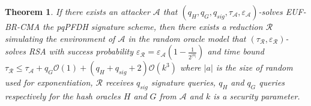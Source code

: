 \documentclass[a4paper,11pt]{article}
\newtheorem{theorem}{Theorem}[section]
\begin{document}
\begin{theorem}
If there exists an attacker $\mathcal{A}$ that    $(q_{H}, q_{G} , q_{sig} , \tau_{\mathcal{A}} ,\varepsilon_{\mathcal{A}} )$-solves
EUF-BR-CMA the pqPFDH signature scheme, then there exists a reduction $\mathcal{R}$ simulating the environment of $\mathcal{A}$ in the random oracle model that  $(\tau_{\mathcal{R}} ,\varepsilon_{\mathcal{R}} )$-solves RSA with  success  probability $\varepsilon_{\mathcal{R}} = \varepsilon_{\mathcal{A}}(1-\frac{1}{2^{|a|}}) $   and time bound $\tau_{\mathcal{R}}\leq \tau_{\mathcal{A}} + q_{G}\mathcal{O}(1) + (q_{H}+ q_{sig}+2)\mathcal{O}(k^{3})$  where $|a|$ is the size of random  used for exponentiation,  $\mathcal{R}$ receives $q_{sig}$ signature queries, $q_{H}$ and $q_{G}$ queries respectively for the hash oracles $H$ and $G$ from  $\mathcal{A}$ and  $k$ is a security parameter.

\end{theorem}
\end{document}
